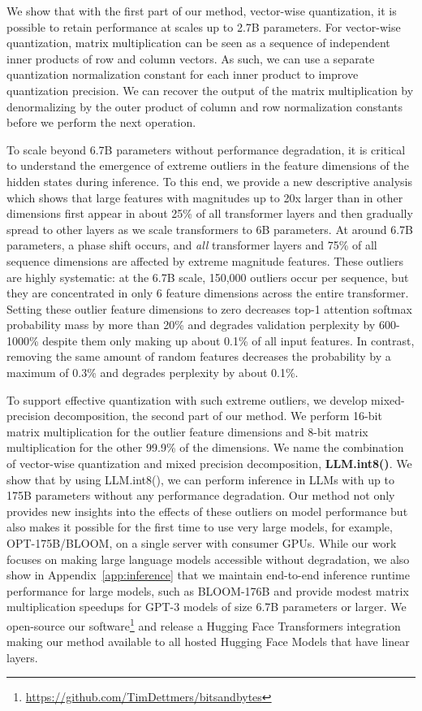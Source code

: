 \documentclass{article}
\begin{document}
We show that with the first part of our method, vector-wise quantization, it is possible to retain performance at scales up to 2.7B parameters. For vector-wise quantization,  matrix multiplication can be seen as a sequence of independent inner products of row and column vectors. As such, we can use a separate quantization normalization constant for each inner product to improve quantization precision. We can recover the output of the matrix multiplication by denormalizing by the outer product of column and row normalization constants before we perform the next operation. 

To scale beyond 6.7B parameters without performance degradation, it is critical to understand the emergence of extreme outliers in the feature dimensions of the hidden states during inference. To this end, we provide a new descriptive analysis which shows that large features with magnitudes up to 20x larger than in other dimensions first appear in about 25\% of all transformer layers and then gradually spread to other layers as we scale transformers to 6B parameters. At around 6.7B parameters, a phase shift occurs, and {\it all} transformer layers and 75\% of all sequence dimensions are affected by extreme magnitude features. These outliers are highly systematic: at the 6.7B scale, 150,000 outliers occur per sequence, but they are concentrated in only 6 feature dimensions across the entire transformer. Setting these outlier feature dimensions to zero decreases top-1 attention softmax probability mass by more than 20\% and degrades validation perplexity by 600-1000\% despite them only making up about 0.1\% of all input features. In contrast, removing the same amount of random features decreases the probability by a maximum of 0.3\% and degrades perplexity by about 0.1\%.

To support effective quantization with such extreme outliers, we develop mixed-precision decomposition, the second part of our method. We perform 16-bit matrix multiplication for the outlier feature dimensions and 8-bit matrix multiplication for the other 99.9\% of the dimensions. We name the combination of vector-wise quantization and mixed precision decomposition, {\bf LLM.int8()}. We show that by using LLM.int8(), we can perform inference in LLMs with up to 175B parameters without any performance degradation. Our method not only provides new insights into the effects of these outliers on model performance but also makes
it possible for the first time to use very large models, for example, OPT-175B/BLOOM, on a single server with consumer GPUs. While our work focuses on making large language models accessible without degradation, we also show in Appendix~\ref{app:inference} that we maintain end-to-end inference runtime performance for large models, such as BLOOM-176B and provide modest matrix multiplication speedups for GPT-3 models of size 6.7B parameters or larger. We open-source our software\footnote{\url{https://github.com/TimDettmers/bitsandbytes}} and release a Hugging Face Transformers \citep{wolf2019huggingface} integration making our method available to all hosted Hugging Face Models that have linear layers.
\end{document}
